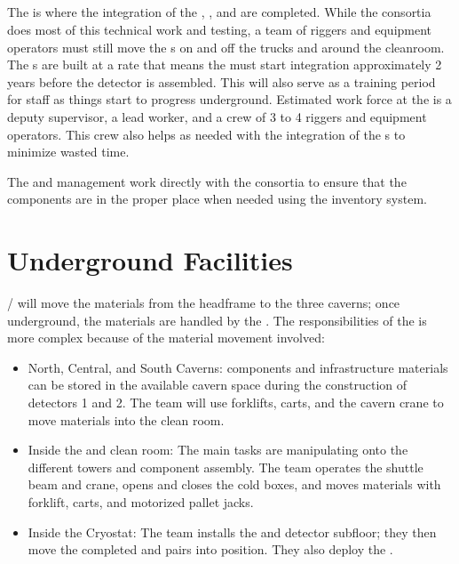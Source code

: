 \subsection{}

The  is where the integration of the
, , and  are completed. While the
consortia does most of this technical work and testing, a team of
riggers and equipment operators must still move the s on
and off the trucks and around the cleanroom.  The s are
built at a rate that means the  must start integration
approximately 2 years before the detector is assembled.  This will
also serve as a training period for  staff as things start
to progress underground.  Estimated work force at the  is a
deputy supervisor, a lead worker, and a crew of 3 to 4 riggers and
equipment operators.  This crew also helps as needed with the
integration of the s to minimize wasted time.

The  and  management work directly with the
consortia to ensure that the components are in the proper place when
needed using the inventory system.
  

\section{Underground Facilities}

\surf/ will move the  materials from the
headframe to the three caverns; once underground, the materials are
handled by the . The responsibilities of the  is
more complex because of the material movement involved:
\begin{itemize}
 \item North, Central, and South Caverns:  components and
   infrastructure materials can be stored in the available cavern
   space during the construction of detectors 1 and 2.  The  team will
   use forklifts, carts, and the cavern crane to move
   materials into the clean room.
 \item Inside the  and clean room: The main tasks are manipulating 
   onto the different  towers and  component
   assembly.  The team operates the shuttle beam and crane, opens and closes the
   cold boxes, and moves materials with forklift, carts, and motorized
   pallet jacks.
 \item Inside the Cryostat: The  team installs the  and detector
   subfloor; they then move the completed  and  pairs into
   position.  They also deploy the .
\end{itemize}

